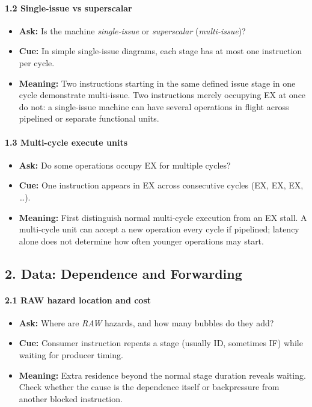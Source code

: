 \paragraph{1.2 Single-issue vs superscalar}\label{par:auto-029}
\begin{itemize}
    \item \textbf{Ask:} Is the machine \textit{single-issue} or \textit{superscalar} (\textit{multi-issue})?
    \item \textbf{Cue:} In simple single-issue diagrams, each stage has at most one instruction per cycle.
    \item \textbf{Meaning:} Two instructions starting in the same defined issue stage in one cycle demonstrate multi-issue.
    Two instructions merely occupying EX at once do not: a single-issue machine can have several operations in flight across pipelined or separate functional units.
\end{itemize}

\paragraph{1.3 Multi-cycle execute units}\label{par:auto-030}
\begin{itemize}
    \item \textbf{Ask:} Do some operations occupy EX for multiple cycles?
    \item \textbf{Cue:} One instruction appears in EX across consecutive cycles (EX, EX, EX, \ldots).
    \item \textbf{Meaning:} First distinguish normal multi-cycle execution from an EX stall.
    A multi-cycle unit can accept a new operation every cycle if pipelined; latency alone does not determine how often younger operations may start.
\end{itemize}

\subsection*{2. Data: Dependence and Forwarding}\label{subsec:auto-016}

\paragraph{2.1 RAW hazard location and cost}\label{par:auto-031}
\begin{itemize}
    \item \textbf{Ask:} Where are \textit{RAW} hazards, and how many bubbles do they add?
    \item \textbf{Cue:} Consumer instruction repeats a stage (usually ID, sometimes IF) while waiting for producer timing.
    \item \textbf{Meaning:} Extra residence beyond the normal stage duration reveals waiting.
    Check whether the cause is the dependence itself or backpressure from another blocked instruction.
\end{itemize}

